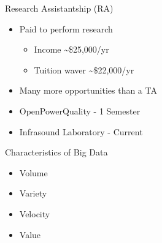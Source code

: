 \documentclass{beamer}
\begin{document}

\begin{frame}{Research Assistantship (RA)}
\begin{itemize}
	\item Paid to perform research 
	\begin{itemize}
		\item Income \textasciitilde\$25,000/yr
		\item Tuition waver \textasciitilde\$22,000/yr
	\end{itemize}
	\item Many more opportunities than a TA
	\item OpenPowerQuality - 1 Semester
	\item Infrasound Laboratory - Current
\end{itemize}
\end{frame}

\begin{frame}{Characteristics of Big Data}
\begin{itemize}
	\item Volume
	\item Variety
	\item Velocity
	\item Value
\end{itemize}
\end{frame}
\end{document}
